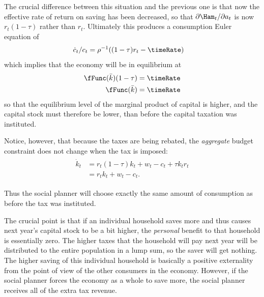 \documentclass{handout}\usepackage{handoutSetup}\usepackage{handoutShortcuts}
\begin{document}
The crucial difference between this situation and the previous one is
that now the effective rate of return on saving has been decreased, so
that $\partial \Ham_{t}/\partial a_{t}$ is now $r_{t}(1-\tau)$ rather
than $r_{t}$.  Ultimately this produces a consumption Euler equation
of
\begin{equation}\begin{gathered}\begin{aligned}
        \dot{c}_{t}/c_{t} & =  \rho^{-1}((1-\tau)r_{t}-\timeRate)
\end{aligned}\end{gathered}\end{equation}
which implies that the economy will be in equilibrium at
\begin{equation}\begin{gathered}\begin{aligned}
        \fFunc(\bar{k})(1-\tau) & =  \timeRate  \\
        \fFunc(\bar{k}) & =  \timeRate
\end{aligned}\end{gathered}\end{equation}
so that the equilibrium level of the marginal product of capital is higher,
and the capital stock must therefore be lower, than before the capital
taxation was instituted.  

Notice, however, that because the taxes are being rebated, the {\it aggregate}
budget constraint does not change when the tax is imposed:
\begin{equation}\begin{gathered}\begin{aligned}
        \dot{k}_t & =  r_{t}(1-\tau)k_{t}+w_{t}-c_{t}+\tau k_{t}r_{t}  \\
         & =  r_{t}k_{t}+w_{t}-c_{t}.
\end{aligned}\end{gathered}\end{equation}

Thus the social planner will choose exactly the same amount of
consumption as before the tax was instituted.

The crucial point is that if an individual household saves more and 
thus causes next year's capital stock to be a bit higher, the {\it 
personal} benefit to that household is essentially zero.  The higher 
taxes that the household will pay next year will be distributed to the 
entire population in a lump sum, so the saver will get nothing.  The 
higher saving of this individual household is basically a positive 
externality from the point of view of the other consumers in the 
economy.  However, if the social planner forces the economy as a whole 
to save more, the social planner receives all of the extra tax 
revenue.

 

\end{document}
